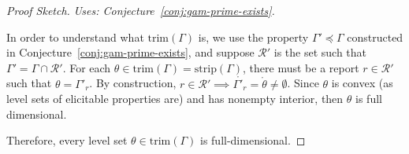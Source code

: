 \documentclass[12pt]{article}
\newcommand{\R}{\mathcal{R}}
\newcommand{\inter}[1]{\mathring{#1}}%
\newcommand{\trim}{\mathrm{trim}}
\newcommand{\strip}{\mathrm{strip}}
\begin{document}
\begin{proof}[Proof Sketch]
	\emph{Uses: Conjecture~\ref{conj:gam-prime-exists}.}
	
	In order to understand what $\trim(\Gamma)$ is, we use the property $\Gamma' \preceq \Gamma$ constructed in Conjecture~\ref{conj:gam-prime-exists}, and suppose $\R'$ is the set such that $\Gamma' = \Gamma\cap \R'$.
	For each $\theta \in \trim(\Gamma) = \strip(\Gamma)$, there must be a report $r \in \R'$ such that $\theta = \Gamma'_r$.
	By construction, $r \in \R' \implies \inter{\Gamma'_r} = \inter{\theta} \neq \emptyset$.
	Since $\theta$ is convex (as level sets of elicitable properties are) and has nonempty interior, then $\theta$ is full dimensional. 
	
	Therefore, every level set $\theta \in \trim(\Gamma)$ is full-dimensional.
	

\end{proof}
\end{document}
